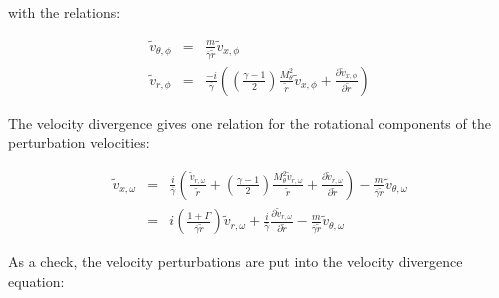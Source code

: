 with the relations:

\begin{eqnarray}
\widetilde{v}_{\theta,\phi}
&=&
\frac{m}{\overline{\gamma} \widetilde{r}} \widetilde{v}_{x,\phi}
\nonumber
\\
\widetilde{v}_{r,\phi}
&=&
\frac{-i}{ \overline{\gamma}}
\left(
\left(\frac{\gamma-1}{2} \right)
\frac{M_{\theta}^2}{\widetilde{r}}
\widetilde{v}_{x,\phi}
+
\frac{\partial \widetilde{v}_{x,\phi}}{\partial \widetilde{r}} 
\right)
\nonumber
\end{eqnarray}

The velocity divergence gives one relation for the rotational
components of the perturbation velocities:

\begin{eqnarray}
\widetilde{v}_{x,\omega}
&=&
\frac{i}{\overline{\gamma}}
\left(
\frac{ \widetilde{v}_{r,\omega}}{\widetilde{r}}
+
\left(
\frac{\gamma-1}{2}
\right)
\frac{
M_{\theta}^2
 \widetilde{v}_{r,\omega}
}{\widetilde{r}}
+ \frac{\partial \widetilde{v}_{r,\omega}}{\partial \widetilde{r}}
\right)
- \frac{m}{\overline{\gamma} \widetilde{r}} \widetilde{v}_{\theta,\omega}
\nonumber
\\
&=&
i
\left(
\frac{ 1 + \Gamma}{\overline{\gamma} \widetilde{r}}
\right)
 \widetilde{v}_{r,\omega}
+ 
\frac{i}{\overline{\gamma}}
\frac{\partial \widetilde{v}_{r,\omega}}{\partial \widetilde{r}}
- \frac{m}{\overline{\gamma} \widetilde{r}} \widetilde{v}_{\theta,\omega}
\nonumber
\end{eqnarray}

As a check, the velocity perturbations
are put into the velocity divergence equation:

